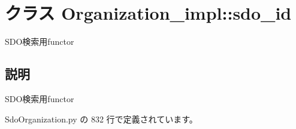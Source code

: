 \section{クラス Organization\_\-impl::sdo\_\-id}
\label{classsource__py_1_1_sdo_organization_1_1_organization__impl_1_1sdo__id}
SDO検索用functor  




\subsection{説明}
SDO検索用functor 

 SdoOrganization.py の 832 行で定義されています。